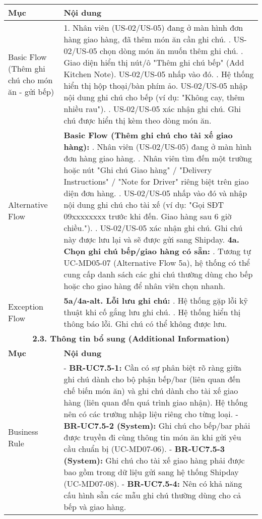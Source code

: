 \begin{longtable}{|m{4cm}|p{11cm}|}
\hline
\textbf{Mục} & \textbf{Nội dung} \\
\hline
Basic Flow (Thêm ghi chú cho món ăn - gửi bếp) & 1. Nhân viên (US-02/US-05) đang ở màn hình đơn hàng giao hàng, đã thêm món ăn cần ghi chú. \newline 2. US-02/US-05 chọn dòng món ăn muốn thêm ghi chú. \newline 3. Giao diện hiển thị nút/ô "Thêm ghi chú bếp" (Add Kitchen Note). US-02/US-05 nhấp vào đó. \newline 4. Hệ thống hiển thị hộp thoại/bàn phím ảo. US-02/US-05 nhập nội dung ghi chú cho bếp (ví dụ: "Không cay, thêm nhiều rau"). \newline 5. US-02/US-05 xác nhận ghi chú. Ghi chú được hiển thị kèm theo dòng món ăn. \\
\hline
Alternative Flow & \textbf{Basic Flow (Thêm ghi chú cho tài xế giao hàng):} \newline    1. Nhân viên (US-02/US-05) đang ở màn hình đơn hàng giao hàng. \newline    2. Nhân viên tìm đến một trường hoặc nút "Ghi chú Giao hàng" / "Delivery Instructions" / "Note for Driver" riêng biệt trên giao diện đơn hàng. \newline    3. US-02/US-05 nhấp vào đó và nhập nội dung ghi chú cho tài xế (ví dụ: "Gọi SĐT 09xxxxxxxx trước khi đến. Giao hàng sau 6 giờ chiều."). \newline    4. US-02/US-05 xác nhận ghi chú. Ghi chú này được lưu lại và sẽ được gửi sang Shipday. \newline \textbf{4a. Chọn ghi chú bếp/giao hàng có sẵn:} \newline    1. Tương tự UC-MD05-07 (Alternative Flow 5a), hệ thống có thể cung cấp danh sách các ghi chú thường dùng cho bếp hoặc cho giao hàng để nhân viên chọn nhanh. \\
\hline
Exception Flow & \textbf{5a/4a-alt. Lỗi lưu ghi chú:} \newline    1. Hệ thống gặp lỗi kỹ thuật khi cố gắng lưu ghi chú. \newline    2. Hệ thống hiển thị thông báo lỗi. Ghi chú có thể không được lưu. \\
\hline
\multicolumn{2}{|c|}{\textbf{2.3. Thông tin bổ sung (Additional Information)}} \\
\hline
\textbf{Mục} & \textbf{Nội dung} \\
\hline
Business Rule & - \textbf{BR-UC7.5-1:} Cần có sự phân biệt rõ ràng giữa ghi chú dành cho bộ phận bếp/bar (liên quan đến chế biến món ăn) và ghi chú dành cho tài xế giao hàng (liên quan đến quá trình giao nhận). Hệ thống nên có các trường nhập liệu riêng cho từng loại. \newline - \textbf{BR-UC7.5-2 (System):} Ghi chú cho bếp/bar phải được truyền đi cùng thông tin món ăn khi gửi yêu cầu chuẩn bị (UC-MD07-06). \newline - \textbf{BR-UC7.5-3 (System):} Ghi chú cho tài xế giao hàng phải được bao gồm trong dữ liệu gửi sang hệ thống Shipday (UC-MD07-08). \newline - \textbf{BR-UC7.5-4:} Nên có khả năng cấu hình sẵn các mẫu ghi chú thường dùng cho cả bếp và giao hàng. \\

\end{longtable}
